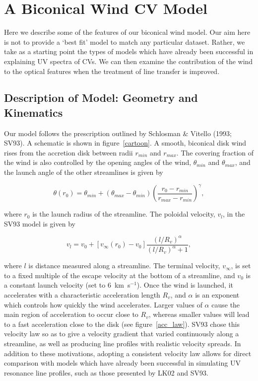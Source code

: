 \documentclass[preprint, a4paper, 11pt]{aastex}
\begin{document}
\section{A Biconical Wind CV Model}

Here we describe some of the features of our biconical wind model. Our aim here is not
to provide a `best fit' model to match any particular dataset.
Rather, we take as a starting point
the types of models which have already been successful in explaining UV spectra of CVs.
We can then examine the contribution of the wind to 
the optical features when the treatment of line transfer
is improved.

\subsection{Description of Model: Geometry and Kinematics}

Our model follows the prescription outlined by Schlosman \& Vitello (1993; SV93). A schematic is shown
in figure~\ref{cartoon}. A smooth, biconical
disk wind rises from the accretion disk between radii $r_{min}$ and $r_{max}$. The covering fraction of the wind is 
also controlled by the opening angles of the wind, $\theta_{min}$ and $\theta_{max}$, and the launch angle of
the other streamlines is given by

\begin{equation}
\theta(r_0) = \theta_{min} + (\theta_{max} - \theta_{min}) \left(\frac{r_0 - r_{min}}{r_{max} - r_{min}} \right)^{\gamma},
\label{theta}
\end{equation}

where $r_0$ is the launch radius of the streamline.
The poloidal velocity, $v_l$, in the SV93 model is given by

\begin{equation}
v_l=v_0+\left[v_{\infty}(r_0)-v_0\right]\frac{\left(l/R_v\right)^{\alpha}}{\left(l/R_v\right)^{\alpha}+1},
\label{v_law}
\end{equation}

where $l$ is distance measured along a  streamline. The terminal velocity, 
$v_{\infty}$, is set to a fixed multiple of the escape velocity at the bottom
of a streamline, and $v_0$ is a constant launch velocity (set to $6$~km~s$^{-1}$).
Once the wind is launched, it accelerates with a characteristic acceleration
length $R_v$, and $\alpha$ is an exponent which controls how quickly the 
wind accelerates. Larger values of $\alpha$ cause the main region of 
acceleration to occur close to $R_v$, whereas smaller values will lead
to a fast acceleration close to the disk (see figure~\ref{acc_law}).
SV93 chose this velocity law so as to give a 
velocity gradient that varied continuously along a streamline, as well
as producing line profiles with realistic velocity spreads.
In addition to these motivations, adopting a consistent velocity law 
allows for direct comparison with models which have already been successful in 
simulating UV resonance line profiles, such as those presented by LK02 and SV93.  
\end{document}
